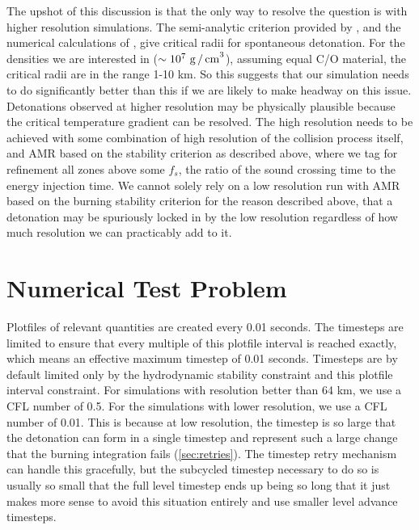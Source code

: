 \documentclass[twocolumn,numberedappendix]{../aastex62}
\begin{document}
The upshot of this discussion is that the only way to resolve the
question is with higher resolution simulations. The semi-analytic
criterion provided by \cite{garg:2017}, and the numerical calculations
of \cite{seitenzahl:2009}, give critical radii for spontaneous detonation.
For the densities we are interested in ($\sim 10^7\ \text{g\,/\,cm}^3$),
assuming equal C/O material, the critical radii are in the range 1-10 km.
So this suggests that our simulation needs to do significantly better than
this if we are likely to make headway on this issue. Detonations observed
at higher resolution may be physically plausible because the critical
temperature gradient can be resolved. The high resolution needs to be
achieved with some combination of high resolution of the collision process
itself, and AMR based on the stability criterion as described
above, where we tag for refinement all zones above some $f_{s}$, the
ratio of the sound crossing time to the energy injection time. We
cannot solely rely on a low resolution run with AMR based on the
burning stability criterion for the reason described above, that a
detonation may be spuriously locked in by the low resolution regardless
of how much resolution we can practicably add to it.



\section{Numerical Test Problem}
\label{sec:collisions}

Plotfiles of relevant quantities are created every 0.01 seconds.
The timesteps are limited to ensure that every multiple of this plotfile interval is
reached exactly, which means an effective maximum timestep of 0.01 seconds. Timesteps
are by default limited only by the hydrodynamic stability constraint and this plotfile
interval constraint. For simulations with resolution better than 64 km, we use a CFL
number of 0.5. For the simulations with lower resolution, we use a CFL number of 0.01.
This is because at low resolution, the timestep is so large that the detonation can
form in a single timestep and represent such a large change that the burning integration
fails (\autoref{sec:retries}). The timestep retry mechanism can handle this gracefully,
but the subcycled timestep necessary to do so is usually so small that the full level
timestep ends up being so long that it just makes more sense to avoid this situation
entirely and use smaller level advance timesteps.
\end{document}
